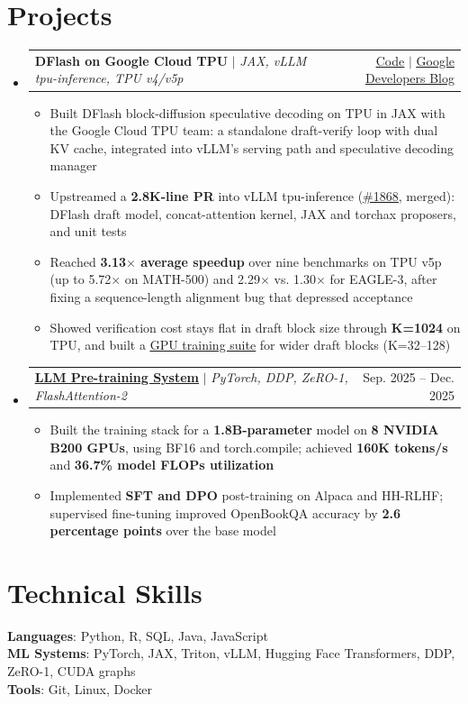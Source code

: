 \documentclass[letterpaper,11pt]{article}
\makeatletter
\newcommand{\resumeItem}[1]{\item\small{{#1 \vspace{-2pt}}}}
\newcommand{\resumeProjectHeading}[2]{
    \item
    \begin{tabular*}{0.97\textwidth}{l@{\extracolsep{\fill}}r}
      \small#1 & #2 \\
    \end{tabular*}\vspace{-7pt}
}
\newcommand{\resumeSubHeadingListStart}{\begin{itemize}[leftmargin=0.15in, label={}]}
\newcommand{\resumeSubHeadingListEnd}{\end{itemize}}
\newcommand{\resumeItemListStart}{\begin{itemize}}
\newcommand{\resumeItemListEnd}{\end{itemize}\vspace{-5pt}}
\makeatother
\begin{document}
\section{Projects}
    \resumeSubHeadingListStart
      \resumeProjectHeading
          {\textbf{DFlash on Google Cloud TPU} $|$ \emph{JAX, vLLM tpu-inference, TPU v4/v5p}}{\href{https://github.com/aaronzhfeng/tpu-spec-decode}{\underline{Code}} $|$ \href{https://developers.googleblog.com/supercharging-llm-inference-on-google-tpus-achieving-3x-speedups-with-diffusion-style-speculative-decoding/}{\underline{Google Developers Blog}}}
          \resumeItemListStart
            \resumeItem{Built DFlash block-diffusion speculative decoding on TPU in JAX with the Google Cloud TPU team: a standalone draft-verify loop with dual KV cache, integrated into vLLM's serving path and speculative decoding manager}
            \resumeItem{Upstreamed a \textbf{2.8K-line PR} into vLLM tpu-inference (\href{https://github.com/vllm-project/tpu-inference/pull/1868}{\underline{\#1868}}, merged): DFlash draft model, concat-attention kernel, JAX and torchax proposers, and unit tests}
            \resumeItem{Reached \textbf{3.13$\times$ average speedup} over nine benchmarks on TPU v5p (up to 5.72$\times$ on MATH-500) and 2.29$\times$ vs. 1.30$\times$ for EAGLE-3, after fixing a sequence-length alignment bug that depressed acceptance}
            \resumeItem{Showed verification cost stays flat in draft block size through \textbf{K=1024} on TPU, and built a \href{https://github.com/aaronzhfeng/dflash-wide}{\underline{GPU training suite}} for wider draft blocks (K=32--128)}
          \resumeItemListEnd
      \resumeProjectHeading
          {\href{https://github.com/aaronzhfeng/llm-foundry}{\underline{\textbf{LLM Pre-training System}}} $|$ \emph{PyTorch, DDP, ZeRO-1, FlashAttention-2}}{Sep. 2025 -- Dec. 2025}
          \resumeItemListStart
            \resumeItem{Built the training stack for a \textbf{1.8B-parameter} model on \textbf{8 NVIDIA B200 GPUs}, using BF16 and torch.compile; achieved \textbf{160K tokens/s} and \textbf{36.7\% model FLOPs utilization}}
            \resumeItem{Implemented \textbf{SFT and DPO} post-training on Alpaca and HH-RLHF; supervised fine-tuning improved OpenBookQA accuracy by \textbf{2.6 percentage points} over the base model}
          \resumeItemListEnd
    \resumeSubHeadingListEnd

\section{Technical Skills}
 \begin{itemize}[leftmargin=0.15in, label={}]
    \small{\item{
     \textbf{Languages}{: Python, R, SQL, Java, JavaScript} \\
     \textbf{ML Systems}{: PyTorch, JAX, Triton, vLLM, Hugging Face Transformers, DDP, ZeRO-1, CUDA graphs} \\
     \textbf{Tools}{: Git, Linux, Docker}
    }}
 \end{itemize}
\end{document}
